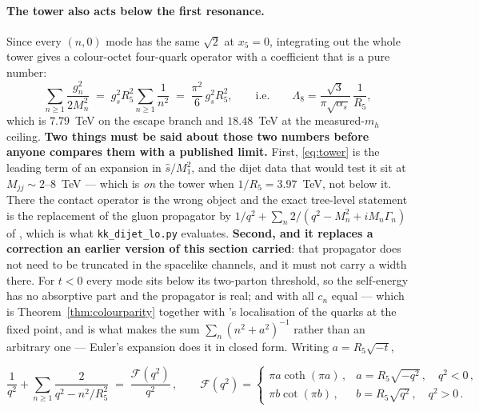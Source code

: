 \documentclass[11pt,a4paper]{article}
\newenvironment{keyeq}
  {\begin{center}\setlength{\fboxsep}{9pt}\setlength{\fboxrule}{0.8pt}%
   \begin{lrbox}{\keyeqbox}\begin{minipage}{0.88\textwidth}}
  {\end{minipage}\end{lrbox}%
   \fcolorbox{hdrblue!55}{hdrblue!6}{\usebox{\keyeqbox}}\end{center}}
\begin{document}
\paragraph{The tower also acts below the first resonance.} Since every $(n,0)$ mode has the same
$\sqrt2$ at $x_5=0$, integrating out the whole tower gives a colour-octet four-quark operator with
a coefficient that is a pure number:
\begin{equation}\label{eq:tower}
  \sum_{n\ge1}\frac{g_n^2}{2M_n^2}
  \;=\;g_s^2R_5^2\sum_{n\ge1}\frac{1}{n^2}
  \;=\;\frac{\pi^2}{6}\,g_s^2R_5^2 ,
  \qquad\text{i.e.}\qquad
  \Lambda_8=\frac{\sqrt3}{\pi\sqrt{\alpha_s}}\,\frac{1}{R_5},
\end{equation}
which is $7.79$~TeV on the escape branch and $18.48$~TeV at the measured-$m_h$ ceiling.
\textbf{Two things must be said about those two numbers before anyone compares them with a
published limit.} First, \eqref{eq:tower} is the leading term of an expansion in
$\hat s/M_1^2$, and the dijet data that would test it sit at $M_{jj}\sim2$--$8$~TeV --- which is
\emph{on} the tower when $1/R_5=3.97$~TeV, not below it. There the contact operator is the wrong
object and the exact tree-level statement is the replacement of the gluon propagator by
$1/q^2+\sum_n 2/(q^2-M_n^2+iM_n\Gamma_n)$ of \cite{DMN01}, which is what
\texttt{kk\_\allowbreak dijet\_\allowbreak lo.py} evaluates. \textbf{Second, and it replaces a
correction an earlier version of this section carried}: that propagator does not need to be
truncated in the spacelike channels, and it must not carry a width there. For $t<0$ every mode
sits below its two-parton threshold, so the self-energy has no absorptive part and the propagator
is real; and with all $c_n$ equal --- which is Theorem~\ref{thm:colourparity} together with
\cite{KM25}'s localisation of the quarks at the fixed point, and is what makes the sum
$\sum_n(n^2+a^2)^{-1}$ rather than an arbitrary one --- Euler's expansion does it in closed form.
Writing $a=R_5\sqrt{-t}$,
\begin{keyeq}
\begin{equation}\label{eq:resum}
  \frac{1}{q^2}+\sum_{n\ge1}\frac{2}{q^2-n^2/R_5^2}\;=\;\frac{\mathcal F(q^2)}{q^2}\,,\qquad
  \mathcal F(q^2)=
  \begin{cases}
    \pi a\coth(\pi a)\,, & a=R_5\sqrt{-q^2}\,,\quad q^2<0\,,\\[2pt]
    \pi b\cot(\pi b)\,,  & b=R_5\sqrt{q^2}\,,\quad q^2>0\,.
  \end{cases}
\end{equation}
\end{keyeq}
\end{document}
